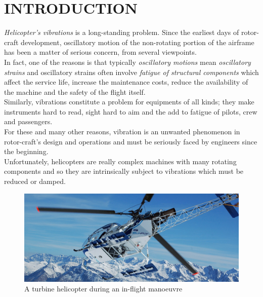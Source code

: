 \chapter*{INTRODUCTION}
\noindent
\emph{Helicopter's vibrations} is a long-standing problem. Since the earliest days of rotor-craft development, oscillatory motion of the non-rotating portion of the airframe has been a matter of serious concern, from several viewpoints. \\ In fact, one of the reasons is that typically \emph{oscillatory motions} mean \emph{oscillatory strains} and oscillatory strains often involve \emph{fatigue of structural components} which affect the service life, increase the maintenance costs, reduce the availability of the machine and the safety of the flight itself. \\
Similarly, vibrations constitute a problem for equipments of all kinds; they make instruments hard to read, sight hard to aim and the add to fatigue of pilots, crew and passengers. \\

\noindent For these and many other reasons, vibration is an unwanted phenomenon in rotor-craft's design and operations and must be seriously faced by engineers since the beginning. \\
Unfortunately, helicopters are really complex machines with many rotating components and so they are intrinsically subject to vibrations which must be reduced or damped. \\

\medskip
\begin{figure}[h]
	\begin{center}
		\centering  		 		
		\includegraphics[width=1\linewidth]{PICTURES/Introduction/PNG/Elicottero_montagne.jpg}
	\end{center}
	\caption {A turbine helicopter during an in-flight manoeuvre}
\end{figure}
\vspace{0.5cm}

